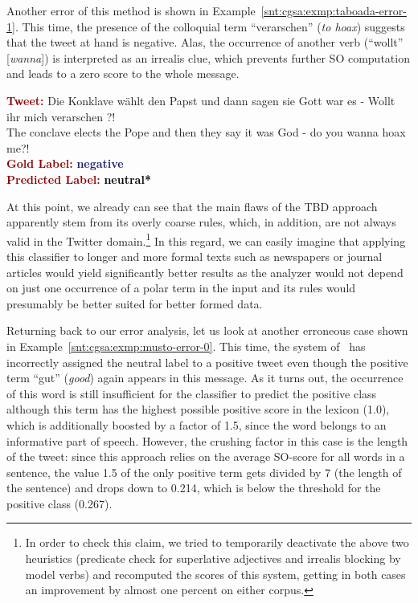 \noindent Another error of this method is shown in
Example~\ref{snt:cgsa:exmp:taboada-error-1}.  This time, the presence
of the colloquial term ``verarschen'' (\emph{to hoax}) suggests that
the tweet at hand is negative.  Alas, the occurrence of another verb
(``wollt'' [\emph{wanna}]) is interpreted as an irrealis clue, which
prevents further SO computation and leads to a zero score to the whole
message.

\begin{example}\label{snt:cgsa:exmp:taboada-error-1}
  \noindent\textup{\bfseries\textcolor{darkred}{Tweet:}} {\upshape Die Konklave w\"ahlt den Papst und dann sagen sie Gott war es - Wollt ihr mich verarschen ?!}\\
  \noindent The conclave elects the Pope and then they say it was God - do you wanna hoax me?!\\[\exampleSep]
  \noindent\textup{\bfseries\textcolor{darkred}{Gold Label:}}\hspace*{4.3em}\textbf{%
    \upshape\textcolor{midnightblue}{negative}}\\
 \noindent\textup{\bfseries\textcolor{darkred}{Predicted Label:}}\hspace*{2em}\textbf{%
    \upshape\textcolor{black}{neutral*}}
\end{example}

At this point, we already can see that the main flaws of the TBD
approach apparently stem from its overly coarse rules, which, in
addition, are not always valid in the Twitter domain.\footnote{In
  order to check this claim, we tried to temporarily deactivate the
  above two heuristics (predicate check for superlative adjectives and
  irrealis blocking by model verbs) and recomputed the scores of this
  system, getting in both cases an improvement by almost one percent
  on either corpus.}  In this regard, we can easily imagine that
applying this classifier to longer and more formal texts such as
newspapers or journal articles would yield significantly better
results as the analyzer would not depend on just one occurrence of a
polar term in the input and its rules would presumably be better
suited for better formed data.

Returning back to our error analysis, let us look at another erroneous
case shown in Example~\ref{snt:cgsa:exmp:musto-error-0}. This time,
the system of~\citet{Musto:14} has incorrectly assigned the neutral
label to a positive tweet even though the positive term ``gut''
(\emph{good}) again appears in this message.  As it turns out, the
occurrence of this word is still insufficient for the classifier to
predict the positive class although this term has the highest possible
positive score in the lexicon (1.0), which is additionally boosted by
a factor of 1.5, since the word belongs to an informative part of
speech.  However, the crushing factor in this case is the length of
the tweet: since this approach relies on the average SO-score for all
words in a sentence, the value 1.5 of the only positive term gets
divided by 7 (the length of the sentence) and drops down to 0.214,
which is below the threshold for the positive class (0.267).

